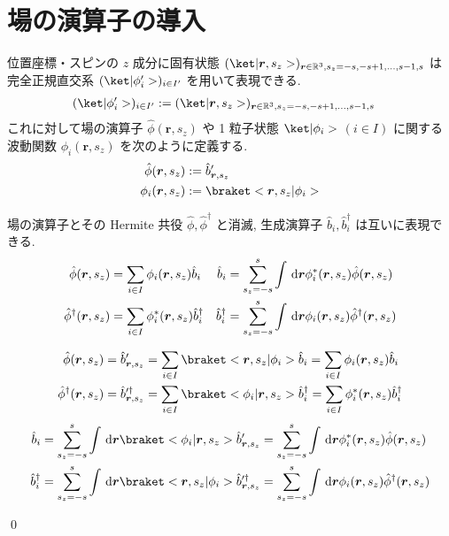 \documentclass[uplatex,dvipdfmx,a4paper,11pt]{jlreq}
\makeatletter
\newcommand{\RR}{\mathbb{R}}
\newcommand{\rr}{\bm{r}}
\numberwithin{equation}{section}
\theoremstyle{definition}
\renewenvironment{proof}[1][\proofname]{\par
  \normalfont
  \topsep6\p@\@plus6\p@ \trivlist
  \item[\hskip\labelsep{\bfseries #1}\@addpunct{\bfseries}]\ignorespaces\quad\par
}{
  \qed\endtrivlist\@endpefalse
}
\renewcommand\proofname{証明}
\makeatother
\begin{document}
\section{場の演算子の導入}
\begin{definition}
  位置座標・スピンの $z$ 成分に固有状態 $(\ket|\rr, s_z>)_{\rr\in\RR^3, s_z = -s,-s+1,\ldots,s-1,s}$ は完全正規直交系 $(\ket|\phi_i'>)_{i\in I'}$ を用いて表現できる.
  \begin{align}
    (\ket|\phi_i'>)_{i\in I'} & := (\ket|\rr, s_z>)_{\rr\in\RR^3, s_z = -s,-s+1,\ldots,s-1,s}
  \end{align}
  これに対して場の演算子 $\hat{\phi}(\rr, s_z)$ や 1 粒子状態 $\ket|\phi_i>$ $(i\in I)$ に関する波動関数 $\phi_i(\rr, s_z)$ を次のように定義する.
  \begin{align}
    \hat{\phi}(\rr, s_z) & := \hat{b}_{\rr,s_z}'       \\
    \phi_i(\rr, s_z)     & := \braket<\rr, s_z|\phi_i>
  \end{align}
\end{definition}
\begin{theorem}[Q21-81(i)(ii), Q21-82]
  場の演算子とその Hermite 共役 $\hat{\phi}, \hat{\phi}^\dagger$ と消滅, 生成演算子 $\hat{b}_i, \hat{b}_i^\dagger$ は互いに表現できる.
  \begin{align}
    \hat{\phi}(\rr, s_z)         & = \sum_{i\in I}\phi_i(\rr, s_z)\hat{b}_i           & \hat{b}_i         & = \sum_{s_z = -s}^s\int\dl{\rr}\phi_i^*(\rr, s_z)\hat{\phi}(\rr, s_z)       \\
    \hat{\phi}^\dagger(\rr, s_z) & = \sum_{i\in I}\phi_i^*(\rr, s_z)\hat{b}_i^\dagger & \hat{b}_i^\dagger & = \sum_{s_z = -s}^s\int\dl{\rr}\phi_i(\rr, s_z)\hat{\phi}^\dagger(\rr, s_z)
  \end{align}
\end{theorem}
\begin{proof}
  \begin{align}
    \hat{\phi}(\rr, s_z)         & = \hat{b}_{\rr,s_z}' = \sum_{i\in I}\braket<\rr,s_z|\phi_i>\hat{b}_i = \sum_{i\in I}\phi_i(\rr, s_z)\hat{b}_i                                  \\
    \hat{\phi}^\dagger(\rr, s_z) & = \hat{b}_{\rr,s_z}^{\prime\dagger} = \sum_{i\in I}\braket<\phi_i|\rr,s_z>\hat{b}_i^\dagger = \sum_{i\in I}\phi_i^*(\rr, s_z)\hat{b}_i^\dagger
  \end{align}
  \begin{align}
    \hat{b}_i         & = \sum_{s_z = -s}^s\int\dl{\rr}\braket<\phi_i|\rr, s_z>\hat{b}_{\rr,s_z}' = \sum_{s_z = -s}^s\int\dl{\rr}\phi_i^*(\rr, s_z)\hat{\phi}(\rr, s_z)                      \\
    \hat{b}_i^\dagger & = \sum_{s_z = -s}^s\int\dl{\rr}\braket<\rr, s_z|\phi_i>\hat{b}_{\rr,s_z}^{\prime\dagger} = \sum_{s_z = -s}^s\int\dl{\rr}\phi_i(\rr, s_z)\hat{\phi}^\dagger(\rr, s_z)
  \end{align}
\end{proof}
\end{document}
